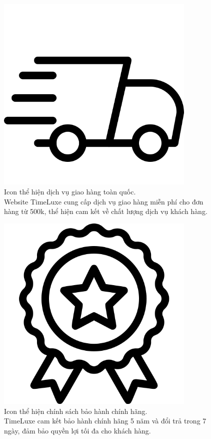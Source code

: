 \begin{figure}[htbp]
    \centering
    \includegraphics[width=0.85\textwidth]{static/icon-shipping.png}
    \caption[Icon dịch vụ giao hàng]{Icon thể hiện dịch vụ giao hàng toàn quốc. \protect\\
    Website TimeLuxe cung cấp dịch vụ giao hàng miễn phí cho đơn hàng từ 500k, thể hiện cam kết về chất lượng dịch vụ khách hàng.}
    \label{fig:shipping}
\end{figure}

\begin{figure}[htbp]
    \centering
    \includegraphics[width=0.85\textwidth]{static/icon-warranty.png}
    \caption[Icon bảo hành chính hãng]{Icon thể hiện chính sách bảo hành chính hãng. \protect\\
    TimeLuxe cam kết bảo hành chính hãng 5 năm và đổi trả trong 7 ngày, đảm bảo quyền lợi tối đa cho khách hàng.}
    \label{fig:warranty}
\end{figure}

